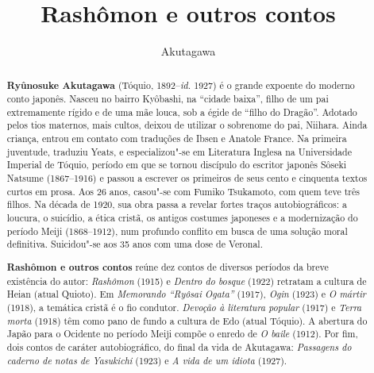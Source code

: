 \documentclass[12pt]{extarticle}
\begin{document}
\newcommand{\AutorLivro}{Akutagawa}
\newcommand{\TituloLivro}{Rashômon e outros contos}
\newcommand{\Tema}{Ficção, mistério e fantasia}
\newcommand{\Genero}{Conto, crônica e novela}
\newcommand{\imagemCapa}{./images/PNLD0009-01.png}
\newcommand{\issnppub}{---}
\newcommand{\issnepub}{---}
\newcommand{\colaborador}{\textbf{Cesar Augusto Araujo Oyakawa, Bruno Gradella e Vicente Castro}}


\title{\TituloLivro}
\author{\AutorLivro}
\def\authornotes{\colaborador}

\date{}
\maketitle

\baselineskip\par

\begin{abstract}

\textbf{Ryûnosuke Akutagawa} (Tóquio, 1892--\textit{id.} 1927) é o grande
  expoente do moderno conto japonês. Nasceu no bairro Kyôbashi, na ``cidade
  baixa'', filho de um pai extremamente rígido e de uma mãe louca, sob a égide
  de ``filho do Dragão''. Adotado pelos tios maternos, mais cultos, deixou de
  utilizar o sobrenome do pai, Niihara. Ainda criança, entrou em contato com
  traduções de Ibsen e Anatole France. Na primeira juventude, traduziu Yeats, e
  especializou"-se em Literatura Inglesa na Universidade Imperial de Tóquio,
  período em que se tornou discípulo do escritor japonês Sôseki Natsume
  (1867--1916) e passou a escrever os primeiros de seus cento e cinquenta
  textos curtos em prosa. Aos 26 anos, casou"-se com Fumiko Tsukamoto, com quem
  teve três filhos.  Na década de 1920, sua obra passa a revelar fortes traços
  autobiográficos: a loucura, o suicídio, a ética cristã, os antigos costumes
  japoneses e a modernização do período Meiji (1868--1912), num profundo
  conflito em busca de uma solução moral definitiva.  Suicidou"-se aos 35 anos
  com uma dose de Veronal. 
        
\textbf{Rashômon e outros contos} reúne dez contos de diversos períodos da
  breve existência do autor: \textit{Rashômon} (1915) e \textit{Dentro do
  bosque} (1922) retratam a cultura de Heian (atual Quioto). Em
  \textit{Memorando ``Ryôsai Ogata''} (1917), \textit{Ogin} (1923) e \textit{O
  mártir} (1918), a temática cristã é o fio condutor.  \textit{Devoção à
  literatura popular} (1917) e \textit{Terra morta} (1918) têm como pano de
  fundo a cultura de Edo (atual Tóquio). A abertura do Japão para o Ocidente no
  período Meiji compõe o enredo de \textit{O baile} (1912). Por fim, dois
  contos de caráter autobiográfico, do final da vida de Akutagawa:
  \textit{Passagens do caderno de notas de Yasukichi} (1923) e \textit{A vida
de um idiota} (1927).      \end{abstract}
\end{document}
